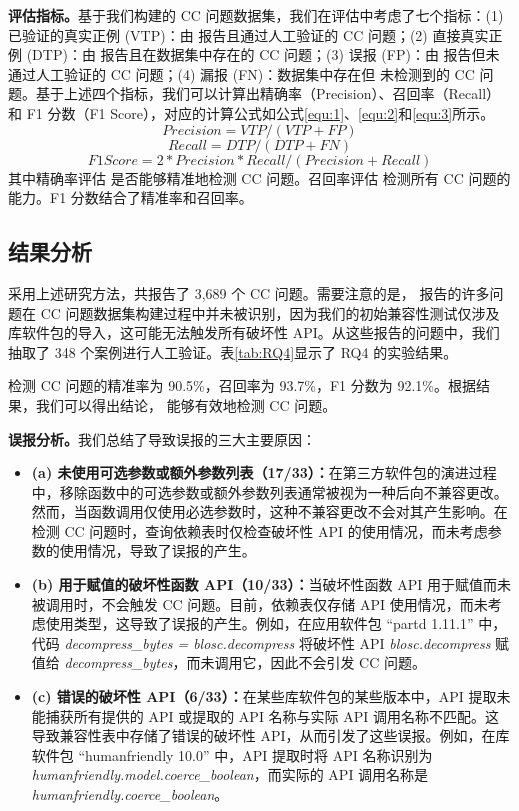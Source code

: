 \textbf{评估指标。}基于我们构建的 CC 问题数据集，我们在评估中考虑了七个指标：(1) 已验证的真实正例 (VTP)：由 \tool{} 报告且通过人工验证的 CC 问题；(2) 直接真实正例 (DTP)：由 \tool{} 报告且在数据集中存在的 CC 问题；(3) 误报 (FP)：由 \tool{} 报告但未通过人工验证的 CC 问题；(4) 漏报 (FN)：数据集中存在但 \tool{} 未检测到的 CC 问题。基于上述四个指标，我们可以计算出精确率（Precision）、召回率（Recall）和 F1 分数（F1 Score），对应的计算公式如公式\ref{equ:1}、\ref{equ:2}和\ref{equ:3}所示。
\begin{equation}
	\label{equ:1}
	Precision = VTP / (VTP + FP)
\end{equation}
\begin{equation}
	\label{equ:2}
	Recall = DTP / (DTP + FN)
\end{equation}
\begin{equation}
	\label{equ:3}
	F1 Score =2 * Precision * Recall / ( Precision + Recall)
\end{equation}
其中精确率评估\tool{} 是否能够精准地检测 CC 问题。召回率评估\tool{} 检测所有 CC 问题的能力。F1 分数结合了精准率和召回率。

\subsection{结果分析}
采用上述研究方法，\tool{}共报告了 3,689 个 CC 问题。需要注意的是，\tool{} 报告的许多问题在 CC 问题数据集构建过程中并未被识别，因为我们的初始兼容性测试仅涉及库软件包的导入，这可能无法触发所有破坏性 API。从这些报告的问题中，我们抽取了 348 个案例进行人工验证。表\ref{tab:RQ4}显示了 RQ4 的实验结果。

\tool{} 检测 CC 问题的精准率为 90.5\%，召回率为 93.7\%，F1 分数为 92.1\%。根据结果，我们可以得出结论，\tool{} 能够有效地检测 CC 问题。

\textbf{误报分析。}我们总结了导致误报的三大主要原因：
\begin{itemize}
	\item \textbf{(a) 未使用可选参数或额外参数列表（17/33）：}在第三方软件包的演进过程中，移除函数中的可选参数或额外参数列表通常被视为一种后向不兼容更改。然而，当函数调用仅使用必选参数时，这种不兼容更改不会对其产生影响。在检测 CC 问题时，\tool{}查询依赖表时仅检查破坏性 API 的使用情况，而未考虑参数的使用情况，导致了误报的产生。
	\item \textbf{ (b) 用于赋值的破坏性函数 API（10/33）：}当破坏性函数 API 用于赋值而未被调用时，不会触发 CC 问题。目前，依赖表仅存储 API 使用情况，而未考虑使用类型，这导致了误报的产生。例如，在应用软件包 “partd 1.11.1”  中，代码 \textit{decompress\_bytes = blosc.decompress} 将破坏性 API \textit{blosc.decompress} 赋值给 \textit{decompress\_bytes}，而未调用它，因此不会引发 CC 问题。
	\item \textbf{ (c) 错误的破坏性 API（6/33）：}在某些库软件包的某些版本中，API 提取未能捕获所有提供的 API 或提取的 API 名称与实际 API 调用名称不匹配。这导致兼容性表中存储了错误的破坏性 API，从而引发了这些误报。例如，在库软件包 “humanfriendly 10.0”  中，API 提取时将 API 名称识别为 \textit{humanfriendly.model.coerce\_boolean}，而实际的 API 调用名称是 \textit{humanfriendly.coerce\_boolean}。
\end{itemize}

